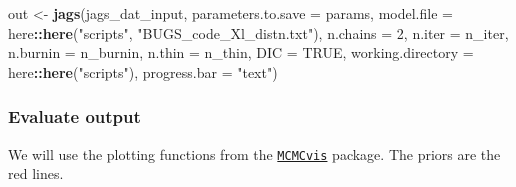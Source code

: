 \documentclass[]{article}
\newenvironment{Shaded}{\begin{snugshade}}{\end{snugshade}}
\newcommand{\DataTypeTok}[1]{\textcolor[rgb]{0.13,0.29,0.53}{#1}}
\newcommand{\DecValTok}[1]{\textcolor[rgb]{0.00,0.00,0.81}{#1}}
\newcommand{\KeywordTok}[1]{\textcolor[rgb]{0.13,0.29,0.53}{\textbf{#1}}}
\newcommand{\NormalTok}[1]{#1}
\newcommand{\OperatorTok}[1]{\textcolor[rgb]{0.81,0.36,0.00}{\textbf{#1}}}
\newcommand{\OtherTok}[1]{\textcolor[rgb]{0.56,0.35,0.01}{#1}}
\newcommand{\StringTok}[1]{\textcolor[rgb]{0.31,0.60,0.02}{#1}}
\begin{document}
\begin{Shaded}
\begin{Highlighting}[]
\NormalTok{out <-}\StringTok{ }\KeywordTok{jags}\NormalTok{(jags_dat_input,}
            \DataTypeTok{parameters.to.save =}\NormalTok{ params,}
            \DataTypeTok{model.file =}\NormalTok{ here}\OperatorTok{::}\KeywordTok{here}\NormalTok{(}\StringTok{"scripts"}\NormalTok{, }\StringTok{"BUGS_code_Xl_distn.txt"}\NormalTok{),}
            \DataTypeTok{n.chains =} \DecValTok{2}\NormalTok{,}
            \DataTypeTok{n.iter =}\NormalTok{ n_iter,}
            \DataTypeTok{n.burnin =}\NormalTok{ n_burnin,}
            \DataTypeTok{n.thin =}\NormalTok{ n_thin,}
            \DataTypeTok{DIC =} \OtherTok{TRUE}\NormalTok{,}
            \DataTypeTok{working.directory =}\NormalTok{ here}\OperatorTok{::}\KeywordTok{here}\NormalTok{(}\StringTok{"scripts"}\NormalTok{),}
            \DataTypeTok{progress.bar =} \StringTok{"text"}\NormalTok{)}
\end{Highlighting}
\end{Shaded}

\hypertarget{evaluate-output}{%
\subsubsection{Evaluate output}\label{evaluate-output}}

We will use the plotting functions from the
\href{https://cran.r-project.org/web/packages/MCMCvis/vignettes/MCMCvis.html}{\texttt{MCMCvis}}
package. The priors are the red lines.
\end{document}
